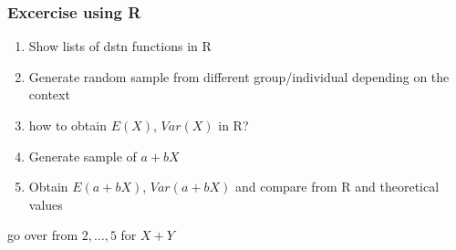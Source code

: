 \begin{frame}
    \frametitle{Excercise using R}
    \begin{enumerate}
        \item Show lists of dstn functions in R
        \item Generate random sample from different group/individual depending on the context
        \item how to obtain $E(X)$, $Var(X)$ in R? 
        \item Generate sample of $a+bX$
        \item Obtain $E(a+bX)$, $Var(a+bX)$ and compare from R and theoretical values
    \end{enumerate}
    go over from $2, \dots, 5$ for $X+Y$
\end{frame}
